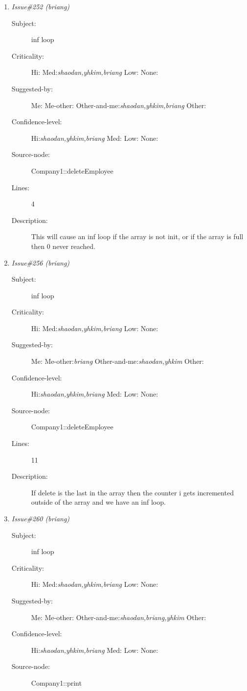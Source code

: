 \begin{enumerate}
\begin{description}
\item [Lines:] 5

\item [Description:] Inf loop if array not init. better to use a
counter for Number of Employees, also crash if number of employees reaches the max
employees.
\end{description}
\item {\it Issue\#252 (briang)}
\begin{description}
\item [Subject:] inf loop
\item [Criticality:] Hi:{\it } Med:{\it shaodan,yhkim,briang} Low:{\it } None:{\it }
\item [Suggested-by:] Me:{\it } Me-other:{\it } Other-and-me:{\it shaodan,yhkim,briang} Other:{\it }
\item [Confidence-level:] Hi:{\it shaodan,yhkim,briang} Med:{\it } Low:{\it } None:{\it }
\item [Source-node:] Company1::deleteEmployee

\item [Lines:] 4

\item [Description:] This will cause an inf loop if the array is
not init, or if the array is full then 0 never reached.
\end{description}
\item {\it Issue\#256 (briang)}
\begin{description}
\item [Subject:] inf loop
\item [Criticality:] Hi:{\it } Med:{\it shaodan,yhkim,briang} Low:{\it } None:{\it }
\item [Suggested-by:] Me:{\it } Me-other:{\it briang} Other-and-me:{\it shaodan,yhkim} Other:{\it }
\item [Confidence-level:] Hi:{\it shaodan,yhkim,briang} Med:{\it } Low:{\it } None:{\it }
\item [Source-node:] Company1::deleteEmployee

\item [Lines:] 11

\item [Description:] If delete is the last in the array then the
counter i gets incremented outside of the array and we have an inf loop.
\end{description}
\item {\it Issue\#260 (briang)}
\begin{description}
\item [Subject:] inf loop
\item [Criticality:] Hi:{\it } Med:{\it shaodan,yhkim,briang} Low:{\it } None:{\it }
\item [Suggested-by:] Me:{\it } Me-other:{\it } Other-and-me:{\it shaodan,briang,yhkim} Other:{\it }
\item [Confidence-level:] Hi:{\it shaodan,yhkim,briang} Med:{\it } Low:{\it } None:{\it }
\item [Source-node:] Company1::print


\end{description}
\end{enumerate}
